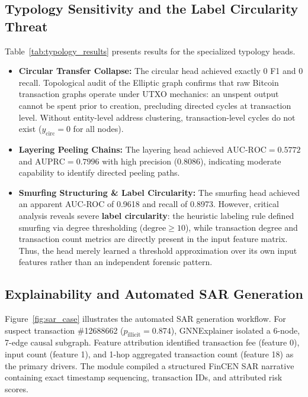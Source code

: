\documentclass[conference]{IEEEtran}
\begin{document}
\subsection{Typology Sensitivity and the Label Circularity Threat}
Table~\ref{tab:typology_results} presents results for the specialized typology heads. 
\begin{itemize}
    \item \textbf{Circular Transfer Collapse:} The circular head achieved exactly 0 F1 and 0 recall. Topological audit of the Elliptic graph confirms that raw Bitcoin transaction graphs operate under UTXO mechanics: an unspent output cannot be spent prior to creation, precluding directed cycles at transaction level. Without entity-level address clustering, transaction-level cycles do not exist ($y_{\text{circ}} = 0$ for all nodes).
    \item \textbf{Layering Peeling Chains:} The layering head achieved $\text{AUC-ROC} = 0.5772$ and $\text{AUPRC} = 0.7996$ with high precision (0.8086), indicating moderate capability to identify directed peeling paths.
    \item \textbf{Smurfing Structuring \& Label Circularity:} The smurfing head achieved an apparent AUC-ROC of 0.9618 and recall of 0.8973. However, critical analysis reveals severe \textbf{label circularity}: the heuristic labeling rule defined smurfing via degree thresholding ($\text{degree} \ge 10$), while transaction degree and transaction count metrics are directly present in the input feature matrix. Thus, the head merely learned a threshold approximation over its own input features rather than an independent forensic pattern.
\end{itemize}

\subsection{Explainability and Automated SAR Generation}
Figure~\ref{fig:sar_case} illustrates the automated SAR generation workflow. For suspect transaction \#12688662 ($p_{\text{illicit}} = 0.874$), GNNExplainer isolated a 6-node, 7-edge causal subgraph. Feature attribution identified transaction fee (feature 0), input count (feature 1), and 1-hop aggregated transaction count (feature 18) as the primary drivers. The module compiled a structured FinCEN SAR narrative containing exact timestamp sequencing, transaction IDs, and attributed risk scores.
\end{document}
